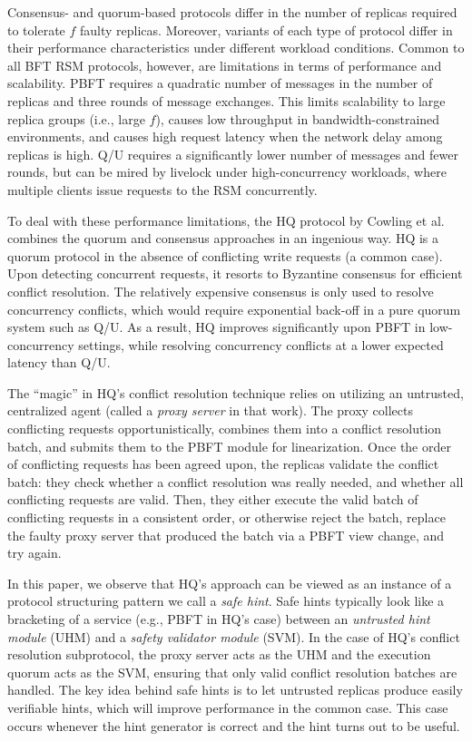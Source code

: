\documentclass[twocolumn,10pt]{article}
\begin{document}
Consensus- and quorum-based protocols differ in the number of replicas
required to tolerate $f$ faulty replicas. Moreover, variants of each
type of protocol differ in their performance characteristics under
different workload conditions. Common to all BFT RSM protocols,
however, are limitations in terms of performance and scalability.
PBFT requires a quadratic number of messages in the number of replicas
and three rounds of message exchanges. This limits scalability to
large replica groups (i.e., large $f$), causes low throughput in
bandwidth-constrained environments, and causes high request latency
when the network delay among replicas is high.  Q/U requires a
significantly lower number of messages and fewer rounds, but can be
mired by livelock under high-concurrency workloads, where multiple
clients issue requests to the RSM concurrently.

To deal with these performance limitations, the HQ protocol by Cowling
et al.~\cite{hq-replication-osdi-06} combines the quorum and consensus
approaches in an ingenious way.  HQ is a quorum protocol in the
absence of conflicting write requests (a common case). Upon detecting
concurrent requests, it resorts to Byzantine consensus for efficient
conflict resolution.  The relatively expensive consensus is only used
to resolve concurrency conflicts, which would require exponential
back-off in a pure quorum system such as Q/U.  As a result, HQ
improves significantly upon PBFT in low-concurrency
settings,
while resolving concurrency conflicts at a lower expected
latency than Q/U.

The ``magic'' in HQ's conflict resolution technique relies on utilizing an untrusted, centralized
agent (called a \emph{proxy server} in that work). The proxy collects
conflicting requests opportunistically, combines them into a conflict
resolution batch, and submits them to the PBFT module for
linearization. Once the order of conflicting requests has been agreed
upon, the replicas validate the conflict batch: they check whether a
conflict resolution was really needed, and whether all conflicting
requests are valid.  Then, they either execute the valid batch of
conflicting requests in a consistent order, or otherwise reject the
batch, replace the faulty proxy server that produced the batch via a
PBFT view change, and try again.

In this paper, we observe that HQ's approach can be viewed as an
instance of a protocol structuring pattern we call a \emph{safe hint}.
Safe hints typically look like a bracketing of a service (e.g., PBFT
in HQ's case) between an \emph{untrusted hint module} (UHM) and a
\emph{safety validator module} (SVM). In the case of HQ's conflict
resolution subprotocol, the proxy server acts as the UHM and the
execution quorum acts as the SVM, ensuring that only valid conflict
resolution batches are handled. The key idea behind safe hints is to
let untrusted replicas produce easily verifiable hints, which will
improve performance in the common case. This case occurs whenever the
hint generator is correct and the hint turns out to be useful.
\end{document}
